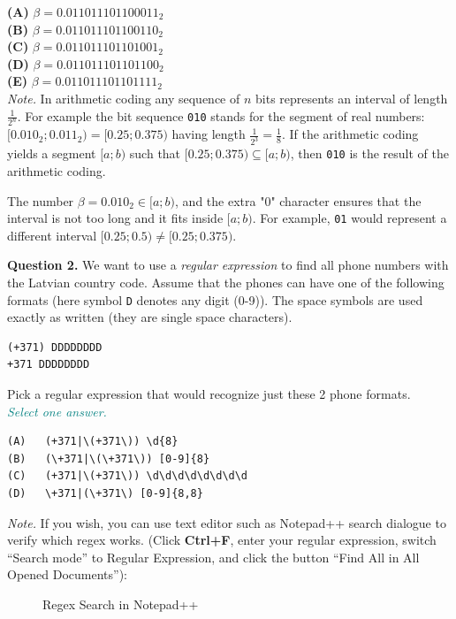 \documentclass[jou]{apa6}
\begin{document}
{\bf (A)} $\beta = 0.011011101100011_2$\\
{\bf (B)} $\beta = 0.011011101100110_2$\\
{\bf (C)} $\beta = 0.011011101101001_2$\\
{\bf (D)} $\beta = 0.011011101101100_2$\\
{\bf (E)} $\beta = 0.011011101101111_2$\\


{\em Note.} In arithmetic coding any sequence of 
$n$ bits represents an interval of length $\frac{1}{2^n}$.
For example the bit sequence {\tt 010} stands for the segment of real numbers:
$[0.010_2; 0.011_2) = [0.25; 0.375)$ having length $\frac{1}{2^3} = \frac{1}{8}$. 
If the arithmetic coding yields a segment $[a;b)$ such that 
$[0.25; 0.375) \subseteq [a;b)$, then {\tt 010} is the 
result of the arithmetic coding.

The number $\beta = 0.010_2 \in [a;b)$, and the extra "0"
character ensures that the interval is not too long and it fits inside $[a;b)$. 
For example, {\tt 01} would represent a different interval $[0.25; 0.5) \neq [0.25; 0.375)$. 


\vspace{10pt}
{\bf Question 2.} We want to use a {\em regular expression} 
to find all phone numbers with the Latvian country code.
Assume that the phones can have one of the following formats (here 
symbol {\tt D} denotes any digit (0-9)). The space symbols
are used exactly as written (they are single space characters).

\begin{verbatim}
(+371) DDDDDDDD
+371 DDDDDDDD
\end{verbatim}

Pick a regular expression that would recognize just these 2 phone formats.\\
\textcolor{teal}{\em Select one answer.}


\begin{verbatim}
(A)   (+371|\(+371\)) \d{8}
(B)   (\+371|\(\+371\)) [0-9]{8}
(C)   (+371|\(+371\)) \d\d\d\d\d\d\d\d
(D)   \+371|(\+371\) [0-9]{8,8}
\end{verbatim}


{\em Note.} If you wish, you can use text editor such as Notepad++ search dialogue 
to verify which regex works. (Click {\bf Ctrl+F}, 
enter your regular expression, switch ``Search mode'' to Regular Expression, 
and click the button  ``Find All in All Opened Documents''): 


\begin{figure}[!htb]
\caption{\label{fig:regex-search} Regex Search in Notepad++}
\end{figure}
\end{document}
